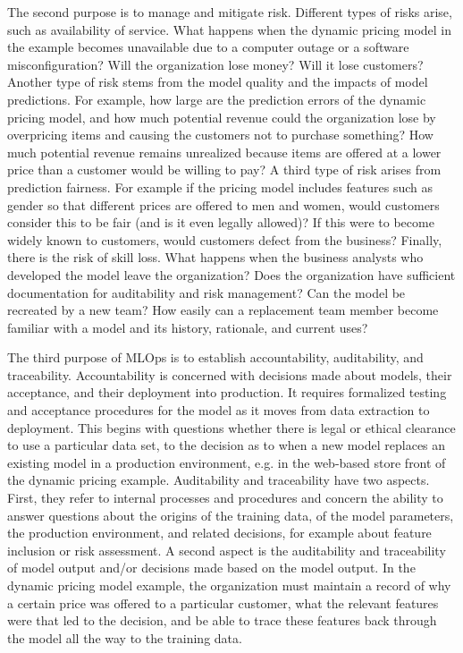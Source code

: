 The second purpose is to manage and mitigate risk. Different types of risks arise, such as availability of service. What happens when the dynamic pricing model in the example becomes unavailable due to a computer outage or a software misconfiguration? Will the organization lose money? Will it lose customers? Another type of risk stems from the model quality and the impacts of model predictions. For example, how large are the prediction errors of the dynamic pricing model, and how much potential revenue could the organization lose by overpricing items and causing the customers not to purchase something? How much potential revenue remains unrealized because items are offered at a lower price than a customer would be willing to pay? A third type of risk arises from prediction fairness. For example if the pricing model includes features such as gender so that different prices are offered to men and women, would customers consider this to be fair (and is it even legally allowed)? If this were to become widely known to customers, would customers defect from the business? Finally, there is the risk of skill loss. What happens when the business analysts who developed the model leave the organization? Does the organization have sufficient documentation for auditability and risk management? Can the model be recreated by a new team? How easily can a replacement team member become familiar with a model and its history, rationale, and current uses?

The third purpose of MLOps is to establish accountability, auditability, and traceability. Accountability is concerned with decisions made about models, their acceptance, and their deployment into production. It requires formalized testing and acceptance procedures for the model as it moves from data extraction to deployment. This begins with questions whether there is legal or ethical clearance to use a particular data set, to the decision as to when a new model replaces an existing model in a production environment, e.g. in the web-based store front of the dynamic pricing example. Auditability and traceability have two aspects. First, they refer to internal processes and procedures and concern the ability to answer questions about the origins of the training data, of the model parameters, the production environment, and related decisions, for example about feature inclusion or risk assessment. A second aspect is the auditability and traceability of model output and/or decisions made based on the model output. In the dynamic pricing model example, the organization must maintain a record of why a certain price was offered to a particular customer, what the relevant features were that led to the decision, and be able to trace these features back through the model all the way to the training data. 

